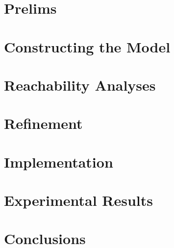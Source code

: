 \documentclass{sig-alternate-05-2015}
\begin{document}
\section{Prelims}
\label{sec:prelims}


\section{Constructing the Model}
\label{sec:modeling}


\section{Reachability Analyses}
\label{sec:reach}


\section{Refinement}
\label{sec:refine}


\section{Implementation}
\label{sec:impl}


\section{Experimental Results}
\label{sec:res}


\section{Conclusions}
\label{sec:concl}




\end{document}
